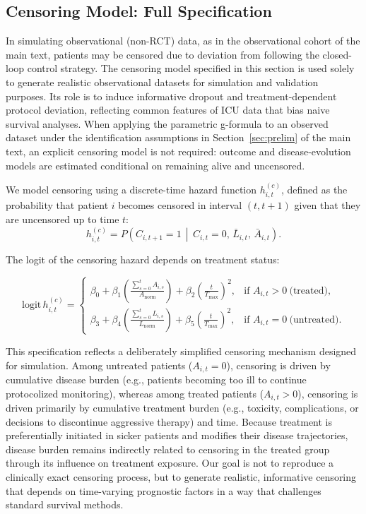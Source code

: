 \subsection{Censoring Model: Full Specification}

In simulating observational (non-RCT) data, as in the observational cohort of the main text, patients may be censored due to deviation from following the closed-loop control strategy. The censoring model specified in this section is used solely to generate realistic observational datasets for simulation and validation purposes. Its role is to induce informative dropout and treatment-dependent protocol deviation, reflecting common features of ICU data that bias naive survival analyses. When applying the parametric g-formula to an observed dataset under the identification assumptions in Section~\ref{sec:prelim} of the main text, an explicit censoring model is not required: outcome and disease-evolution models are estimated conditional on remaining alive and uncensored.

We model censoring using a discrete-time hazard function \( h^{(c)}_{i,t} \), defined as the probability that patient \( i \) becomes censored in interval \( (t, t+1) \) given that they are uncensored up to time \( t \):
\[
h^{(c)}_{i,t} = P\!\left(C_{i,t+1} = 1 \,\middle|\, C_{i,t} = 0, \,\bar{L}_{i,t}, \,\bar{A}_{i,t} \right).
\]

The logit of the censoring hazard depends on treatment status:

\begin{equation}
\text{logit}\,h^{(c)}_{i,t} =
\begin{cases}
\beta_0 + \beta_1 \left(\frac{\sum_{s=0}^{t} A_{i,s}}{A_{\mathrm{norm}}}\right) + \beta_2 \left(\frac{t}{T_{\max}}\right)^2, & \text{if } A_{i,t} >0 \ \text{(treated)}, \\[6pt]
\beta_3 + \beta_4 \left(\frac{\sum_{s=0}^{t} L_{i,s}}{L_{\mathrm{norm}}}\right) + \beta_5 \left(\frac{t}{T_{\max}}\right)^2, & \text{if } A_{i,t}=0 \ \text{(untreated)}.
\end{cases}
\end{equation}

This specification reflects a deliberately simplified censoring mechanism designed for simulation. 
Among untreated patients ($A_{i,t}=0$), censoring is driven by cumulative disease burden 
(e.g., patients becoming too ill to continue protocolized monitoring), whereas among treated patients 
($A_{i,t}>0$), censoring is driven primarily by cumulative treatment burden 
(e.g., toxicity, complications, or decisions to discontinue aggressive therapy) and time. 
Because treatment is preferentially initiated in sicker patients and modifies their disease trajectories, 
disease burden remains indirectly related to censoring in the treated group through its influence on treatment exposure. 
Our goal is not to reproduce a clinically exact censoring process, but to generate realistic, 
informative censoring that depends on time-varying prognostic factors in a way that challenges standard survival methods.

